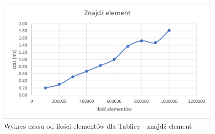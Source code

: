\documentclass{article}
\begin{document}
    \begin{figure}[H]
        \centering
        \includegraphics[scale = 0.85]{wykresy/arr/find.png}
        \caption{Wykres czasu od ilości elementów dla Tablicy - znajdź element}
    \end{figure}    
\end{document}
